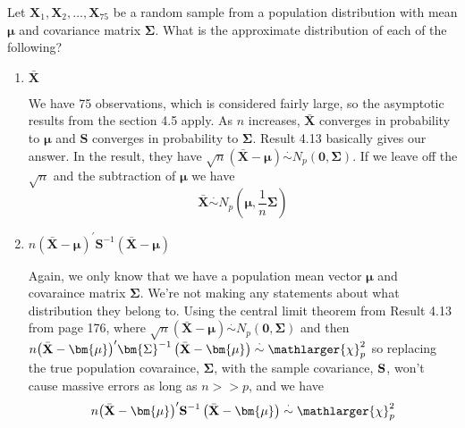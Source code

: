 Let $\textbf{X}_{1}, \textbf{X}_{2}, \dots , \textbf{X}_{75}$ be a random sample from a population distribution with mean $\bm{\mu}$
and covariance matrix $\bm{\Sigma}$. What is the approximate distribution of each of the following?
\begin{enumerate}[label= (\alph*)]
    \item $\bar{\textbf{X}}$
    \vspace{0.4cm}
    \par We have 75 observations, which is considered fairly large, so the asymptotic results from the section 4.5 apply. As $n$ increases, $\bar{\textbf{X}}$ converges in probability to $\bm{\mu}$ and $\textbf{S}$ converges in probability to $\bm{\Sigma}$. 
    Result 4.13 basically gives our answer. 
    In the result, they have $\sqrt{n}\left(\bar{\textbf{X}} - \bm{\mu}\right) \overset{\cdot}{\sim} N_{p}\left(\textbf{0}, \bm{\Sigma}\right)$. If we leave off the $\sqrt{n}$ and the subtraction of $\bm{\mu}$ we have
    \[
        \bar{\textbf{X}}
        \overset{\cdot}{\sim}
        N_{p}
        \left(
            \bm{\mu},
            \frac{1}{n}
            \bm{\Sigma}
        \right)
    \]

    \item $n{\left(\bar{\textbf{X}} - \bm{\mu}\right)}^{\prime}\textbf{S}^{-1}\left(\bar{\textbf{X}} - \bm{\mu}\right)$
    \vspace{0.4cm}
    \par Again, we only know that we have a population mean vector $\bm{\mu}$ and covaraince matrix $\bm{\Sigma}$. We're not making any statements about what distribution they belong to. Using the central limit theorem from Result 4.13 from page 176, where $\sqrt{n}\left(\bar{\textbf{X}} - \bm{\mu}\right) \overset{\cdot}{\sim} N_{p}\left(\textbf{0}, \bm{\Sigma}\right)$ and then $n{\left(\bar{\textbf{X}} - \bm{\mu}\right)}^{\prime}\bm{\Sigma}^{-1}\left(\bar{\textbf{X}} - \bm{\mu}\right) \overset{\cdot}{\sim} \mathlarger{\chi}_{p}^{2}$
    so replacing the true population covaraince, $\bm{\Sigma}$, with the sample covariance, $\textbf{\textbf{S}}$, won't cause massive errors as long as $n >>p$, and we have
    \[
        n{\left(\bar{\textbf{X}} - \bm{\mu}\right)}^{\prime}\textbf{S}^{-1}\left(\bar{\textbf{X}} - \bm{\mu}\right)
        \overset{\cdot}{\sim}
        \mathlarger{\chi}_{p}^{2}
    \]
\end{enumerate}